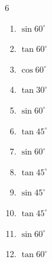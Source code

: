 \begin{multicols}{6}
\begin{enumerate}

  \item $\displaystyle \sin{60^\circ}$


  \item $\displaystyle \tan{60^\circ}$


  \item $\displaystyle \cos{60^\circ}$


  \item $\displaystyle \tan{30^\circ}$


  \item $\displaystyle \sin{60^\circ}$


  \item $\displaystyle \tan{45^\circ}$

        \phantom{$\displaystyle =1$}

  \item $\displaystyle \sin{60^\circ}$


  \item $\displaystyle \tan{45^\circ}$

        \phantom{$\displaystyle =1$}

  \item $\displaystyle \sin{45^\circ}$


  \item $\displaystyle \tan{45^\circ}$

        \phantom{$\displaystyle =1$}

  \item $\displaystyle \sin{60^\circ}$


\columnbreak %

\resetques

  \item $\displaystyle \tan{60^\circ}$


\end{enumerate}
\end{multicols}
